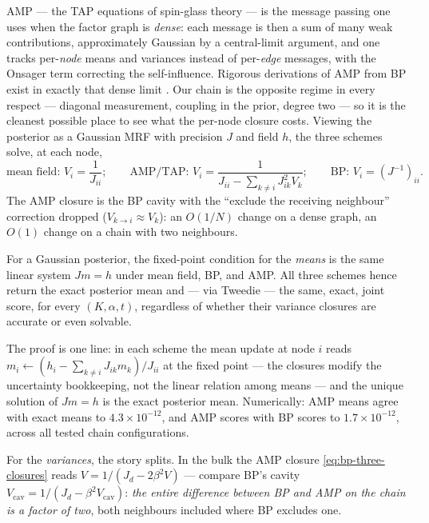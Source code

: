 AMP --- the TAP equations of spin-glass theory
\citep{thouless1977solution, donoho2009message, zdeborova2016statistical}
--- is the message passing one uses when the factor graph is \emph{dense}:
each message is then a sum of many weak contributions, approximately
Gaussian by a central-limit argument, and one tracks per-\emph{node} means
and variances instead of per-\emph{edge} messages, with the Onsager term
correcting the self-influence. Rigorous derivations of AMP from BP exist
in exactly that dense limit \citep{genovese2026amp}. Our chain is the
opposite regime in every respect --- diagonal measurement, coupling in the
prior, degree two --- so it is the cleanest possible place to see what the
per-node closure costs. Viewing the posterior as a Gaussian MRF with
precision $J$ and field $h$, the three schemes solve, at each node,
\begin{equation}
  \text{mean field: } V_i = \frac{1}{J_{ii}};
  \qquad
  \text{AMP/TAP: } V_i = \frac{1}{J_{ii} - \sum_{k \neq i} J_{ik}^2 V_k};
  \qquad
  \text{BP: } V_i = (J^{-1})_{ii} .
  \label{eq:bp-three-closures}
\end{equation}
The AMP closure is the BP cavity with the ``exclude the receiving
neighbour'' correction dropped ($V_{k \to i} \approx V_k$): an $O(1/N)$
change on a dense graph, an $O(1)$ change on a chain with two neighbours.

\begin{theorem}\label{thm:bp-same-score}
For a Gaussian posterior, the fixed-point condition for the \emph{means}
is the same linear system $J m = h$ under mean field, BP, and AMP. All
three schemes hence return the exact posterior mean and --- via Tweedie
--- the same, exact, joint score, for every $(K, \alpha, t)$, regardless
of whether their variance closures are accurate or even solvable.
\end{theorem}

The proof is one line: in each scheme the mean update at node $i$ reads
$m_i \leftarrow (h_i - \sum_{k \neq i} J_{ik} m_k)/J_{ii}$ at the fixed
point --- the closures modify the uncertainty bookkeeping, not the linear
relation among means --- and the unique solution of $Jm = h$ is the exact
posterior mean. Numerically: AMP means agree with exact means to
$4.3 \times 10^{-12}$, and AMP scores with BP scores to
$1.7 \times 10^{-12}$, across all tested chain configurations.

For the \emph{variances}, the story splits. In the bulk the AMP closure
\eqref{eq:bp-three-closures} reads $V = 1/(J_d - 2\beta^2 V)$ --- compare
BP's cavity $V_{\mathrm{cav}} = 1/(J_d - \beta^2 V_{\mathrm{cav}})$:
\emph{the entire difference between BP and AMP on the chain is a factor of
two}, both neighbours included where BP excludes one.

